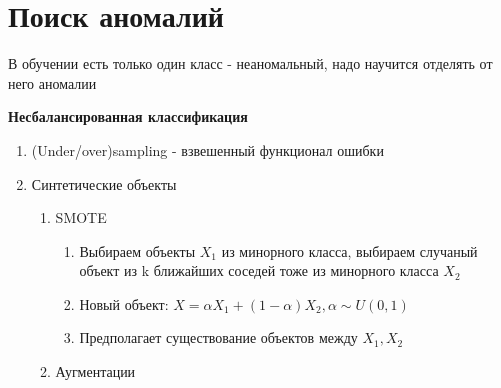 \documentclass[a4paper, 12pt]{article}
\begin{document}
\section{Поиск аномалий}

В обучении есть только один класс - неаномальный, 
надо научится отделять от него аномалии

\textbf{Несбалансированная классификация}
\begin{enumerate}
    \item (Under/over)sampling - взвешенный 
    функционал ошибки
    \item Синтетические объекты
    \begin{enumerate}
        \item SMOTE
        \begin{enumerate}
            \item Выбираем объекты $X_1$ из минорного класса,
            выбираем случаный объект из k ближайших соседей
            тоже из минорного класса $X_2$
            \item Новый объект: \(X = \alpha X_1 + (1 - \alpha)X_2, 
            \alpha \sim U(0, 1)\)
            \item Предполагает существование объектов между $X_1, X_2$
        \end{enumerate}
    \item Аугментации
    \end{enumerate}
\end{enumerate}
\end{document}
